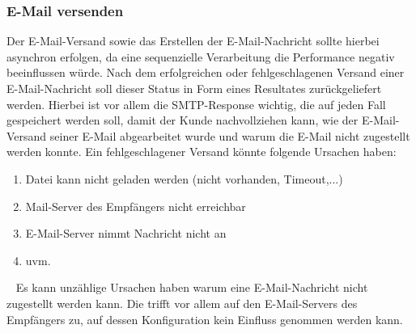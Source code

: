 \subsubsection{E-Mail versenden}
Der E-Mail-Versand sowie das Erstellen der E-Mail-Nachricht sollte hierbei asynchron erfolgen, da eine sequenzielle Verarbeitung die Performance negativ beeinflussen würde. Nach dem erfolgreichen oder fehlgeschlagenen Versand einer E-Mail-Nachricht soll dieser Status in Form eines Resultates zurückgeliefert werden. Hierbei ist vor allem die SMTP-Response wichtig, die auf jeden Fall gespeichert werden soll, damit der Kunde nachvollziehen kann, wie der E-Mail-Versand seiner E-Mail abgearbeitet wurde und warum die E-Mail nicht zugestellt werden konnte. Ein fehlgeschlagener Versand könnte folgende Ursachen haben:
\begin{enumerate}
	\item Datei kann nicht geladen werden (nicht vorhanden, Timeout,...)
	\item Mail-Server des Empfängers nicht erreichbar
	\item E-Mail-Server nimmt Nachricht nicht an
	\item uvm.
\end{enumerate}
\ \newline
Es kann unzählige Ursachen haben warum eine E-Mail-Nachricht nicht zugestellt werden kann. Die trifft vor allem auf den E-Mail-Servers des Empfängers zu, auf dessen Konfiguration kein Einfluss genommen werden kann.

\newpage
